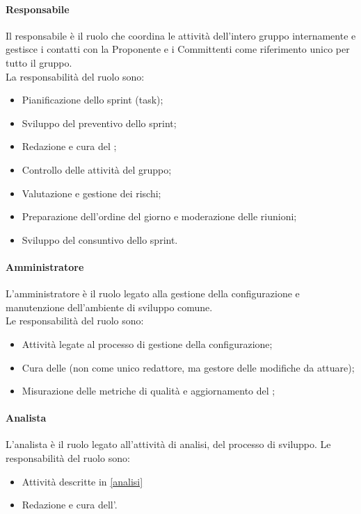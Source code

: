 \paragraph{Responsabile}
Il responsabile è il ruolo che coordina le attività dell'intero gruppo internamente e gestisce i contatti con la Proponente e i Committenti come riferimento unico per tutto il gruppo.\\
La responsabilità del ruolo sono:
\begin{itemize}
  \item Pianificazione dello sprint (task);
  \item Sviluppo del preventivo dello sprint;
  \item Redazione e cura del \PdP;
  \item Controllo delle attività del gruppo;
  \item Valutazione e gestione dei rischi;
  \item Preparazione dell'ordine del giorno e moderazione delle riunioni;
  \item Sviluppo del consuntivo dello sprint.
\end{itemize}

\paragraph{Amministratore}
L'amministratore è il ruolo legato alla gestione della configurazione e manutenzione dell'ambiente di sviluppo comune.\\
Le responsabilità del ruolo sono:
\begin{itemize}
  \item Attività legate al processo di gestione della configurazione;
  \item Cura delle \NdP{} (non come unico redattore, ma gestore delle modifiche da attuare);
  \item Misurazione delle metriche di qualità e aggiornamento del \PdQ;
\end{itemize}

\paragraph{Analista}
L'analista{} è il ruolo legato all'attività di analisi, del processo di sviluppo.
Le responsabilità del ruolo sono:
\begin{itemize}
  \item Attività descritte in \ref{analisi}
  \item Redazione e cura dell'\AdR.
\end{itemize}

